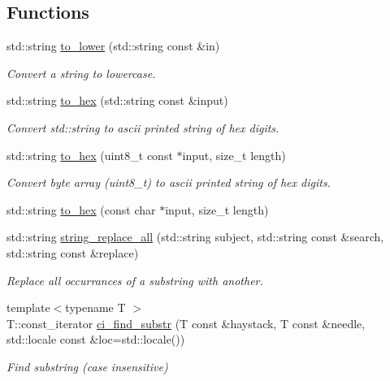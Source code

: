 \subsection*{Functions}
\begin{DoxyCompactItemize}
\item 
std\+::string \hyperlink{namespacewebsocketpp_1_1utility_aa96a743a4f0392aac39742c3e5dfd1cc}{to\+\_\+lower} (std\+::string const \&in)
\begin{DoxyCompactList}\small\item\em Convert a string to lowercase. \end{DoxyCompactList}\item 
std\+::string \hyperlink{namespacewebsocketpp_1_1utility_a26e5a26395d95d2f6bf3a9edb8d06dd2}{to\+\_\+hex} (std\+::string const \&input)
\begin{DoxyCompactList}\small\item\em Convert std\+::string to ascii printed string of hex digits. \end{DoxyCompactList}\item 
std\+::string \hyperlink{namespacewebsocketpp_1_1utility_a42132bbbc1632f7ba964bd87ac5f288f}{to\+\_\+hex} (uint8\+\_\+t const $\ast$input, size\+\_\+t length)
\begin{DoxyCompactList}\small\item\em Convert byte array (uint8\+\_\+t) to ascii printed string of hex digits. \end{DoxyCompactList}\item 
std\+::string \hyperlink{namespacewebsocketpp_1_1utility_af1fbe277765d5d3c27eb5a369b7cd938}{to\+\_\+hex} (const char $\ast$input, size\+\_\+t length)
\item 
std\+::string \hyperlink{namespacewebsocketpp_1_1utility_a5d36afd6d8da4b22b5d634e035bfb450}{string\+\_\+replace\+\_\+all} (std\+::string subject, std\+::string const \&search, std\+::string const \&replace)
\begin{DoxyCompactList}\small\item\em Replace all occurrances of a substring with another. \end{DoxyCompactList}\item 
{\footnotesize template$<$typename T $>$ }\\T\+::const\+\_\+iterator \hyperlink{namespacewebsocketpp_1_1utility_a484f1287b93cf58cc6514e46eed41568}{ci\+\_\+find\+\_\+substr} (T const \&haystack, T const \&needle, std\+::locale const \&loc=std\+::locale())
\begin{DoxyCompactList}\small\item\em Find substring (case insensitive) \end{DoxyCompactList}\item 

\end{DoxyCompactItemize}
